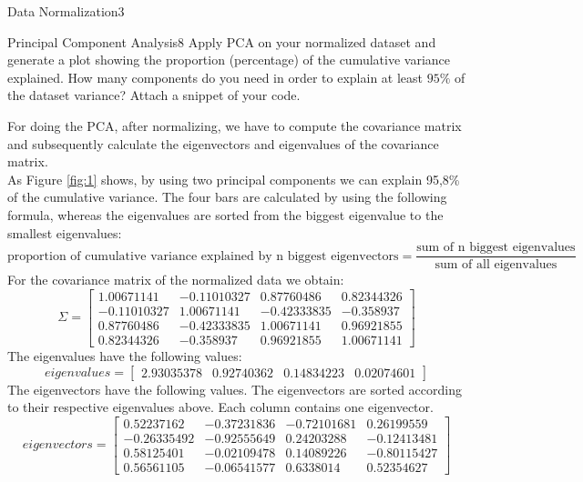 \begin{questions}
\begin{question}{Data Normalization}{3}
\end{question}


\begin{question}{Principal Component Analysis}{8}
Apply PCA on your normalized dataset and generate a plot showing the proportion (percentage) of the cumulative variance explained. 
How many components do you need in order to explain at least $95\%$ of the dataset variance? 
Attach a snippet of your code.
\begin{answer}
For doing the PCA, after normalizing, we have to compute the covariance matrix and subsequently calculate the eigenvectors and eigenvalues of the covariance matrix.\\
As Figure \ref{fig:1} shows, by using two principal components we can explain 95,8\% of the cumulative variance. The four bars are calculated by using the following formula, whereas the eigenvalues are sorted from the biggest eigenvalue to the smallest eigenvalues:
\begin{equation*}
\textrm{proportion of cumulative variance explained by n biggest eigenvectors} = \frac{\textrm{sum of n biggest eigenvalues}} {\textrm{sum of all eigenvalues}} 
\end{equation*}
For the covariance matrix of the normalized data we obtain:
$$\Sigma=\begin{bmatrix} 
1.00671141 & -0.11010327 & 0.87760486 & 0.82344326 \\
-0.11010327 & 1.00671141& -0.42333835& -0.358937  \\
0.87760486 &-0.42333835 & 1.00671141 & 0.96921855 \\
0.82344326& -0.358937  &  0.96921855 & 1.00671141
\end{bmatrix}$$
The eigenvalues have the following values:
$$eigenvalues = \begin{bmatrix} 
2.93035378 & 0.92740362& 0.14834223 &0.02074601
\end{bmatrix}$$
The eigenvectors have the following values. The eigenvectors are sorted according to their respective eigenvalues above. Each column contains one eigenvector.
$$eigenvectors = \begin{bmatrix} 
 0.52237162 &-0.37231836 &-0.72101681 & 0.26199559\\
 -0.26335492 &-0.92555649 & 0.24203288 &-0.12413481\\
 0.58125401 &-0.02109478&  0.14089226 &-0.80115427\\
 0.56561105& -0.06541577 & 0.6338014 &  0.52354627

\end{bmatrix}$$
\end{answer}
\end{question}
\end{questions}
